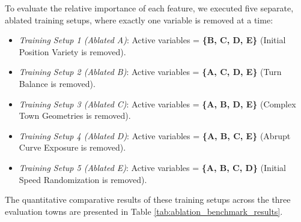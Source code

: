 \documentclass[sn-mathphys,Numbered]{sn-jnl}
\begin{document}
To evaluate the relative importance of each feature, we executed five separate, ablated training setups, where exactly one variable is removed at a time:
\begin{itemize}
    \item \textit{Training Setup 1 (Ablated A)}: Active variables = \textbf{\{B, C, D, E\}} (Initial Position Variety is removed).
    \item \textit{Training Setup 2 (Ablated B)}: Active variables = \textbf{\{A, C, D, E\}} (Turn Balance is removed).
    \item \textit{Training Setup 3 (Ablated C)}: Active variables = \textbf{\{A, B, D, E\}} (Complex Town Geometries is removed).
    \item \textit{Training Setup 4 (Ablated D)}: Active variables = \textbf{\{A, B, C, E\}} (Abrupt Curve Exposure is removed).
    \item \textit{Training Setup 5 (Ablated E)}: Active variables = \textbf{\{A, B, C, D\}} (Initial Speed Randomization is removed).
\end{itemize}

The quantitative comparative results of these training setups across the three evaluation towns are presented in Table \ref{tab:ablation_benchmark_results}.
\end{document}
